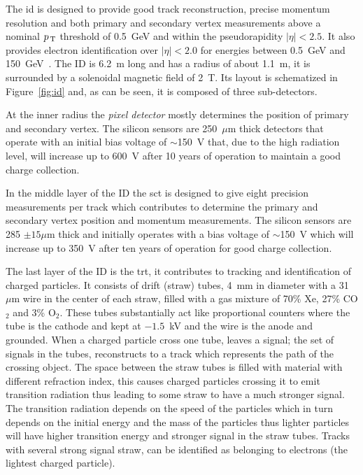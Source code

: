The \gls{id} is designed to provide good track reconstruction, precise momentum
resolution and both primary and secondary vertex measurements above a nominal
$p_\mathrm{\, T}$ threshold of 0.5~GeV and within the pseudorapidity $|\eta| < 2.5$. It also
provides electron identification over $|\eta| < 2.0$ for energies between
0.5~GeV and 150~GeV~\cite{ATLASPaper}. The ID is 6.2~m long and has a radius of
about 1.1~m, it is surrounded by a solenoidal magnetic field of 2~T. Its layout
is schematized in Figure~\ref{fig:id} and, as can be seen, it is composed of
three sub-detectors.

At the inner radius the \emph{pixel detector} mostly determines the position of
primary and secondary vertex. The silicon sensors are 250~$\mu$m thick detectors
that operate with an initial bias voltage of $\sim$150~V that, due to the high
radiation level, will increase up to 600~V after 10 years of operation to
maintain a good charge collection.

In the middle layer of the ID the \gls{sct} is designed to give eight precision
measurements per track which contributes to determine the primary and secondary
vertex position and momentum measurements. The silicon sensors are 285
$\pm 15 \mu$m thick and initially operates with a bias voltage of $\sim$150~V
which will increase up to 350~V after ten years of operation for good charge
collection.

The last layer of the ID is the \gls{trt}, it contributes to tracking and
identification of charged particles. It consists of drift (straw) tubes, 4~mm in
diameter with a 31~$\mu$m wire in the center of each straw, filled with a gas
mixture of 70\% Xe, 27\% CO$_2$ and 3\% O$_2$. These tubes substantially act
like proportional counters where the tube is the cathode and kept at $- 1.5$~kV
and the wire is the anode and grounded. When a charged particle cross one tube,
leaves a signal; the set of signals in the tubes, reconstructs to a track which
represents the path of the crossing object. The space between the straw tubes is
filled with material with different refraction index, this causes charged
particles crossing it to emit transition radiation thus leading to some straw to
have a much stronger signal. The transition radiation depends on the speed of
the particles which in turn depends on the initial energy and the mass of the
particles thus lighter particles will have higher transition energy and stronger
signal in the straw tubes. Tracks with several strong signal straw, can be
identified as belonging to electrons (the lightest charged particle).

